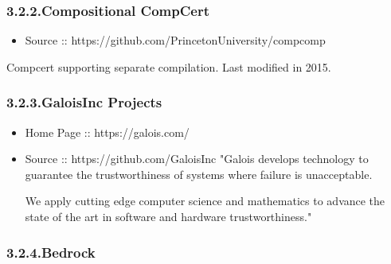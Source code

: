 \documentclass[12pt,twoside]{article}
\begin{document}
\subsubsection{3.2.2.\hspace*{0.5em}Compositional CompCert}\label{sec-compositional-compcert}%

\begin{itemize}[noitemsep,topsep=\mdcompacttopsep]%

\item{}Source :: https://github.com/PrincetonUniversity/compcomp%
\end{itemize}%

\noindent{}Compcert supporting separate compilation. Last modified in 2015.%

\subsubsection{3.2.3.\hspace*{0.5em}GaloisInc Projects}\label{sec-galoisinc-projects}%

\begin{itemize}%

\item{}
Home Page :: https://galois.com/%

\item{}
Source :: https://github.com/GaloisInc
  "Galois develops technology to guarantee the trustworthiness of
  systems where failure is unacceptable.%

  We apply cutting edge computer science and mathematics to advance the
  state of the art in software and hardware trustworthiness."%
\end{itemize}%

\subsubsection{3.2.4.\hspace*{0.5em}Bedrock}\label{sec-bedrock}%
\end{document}
